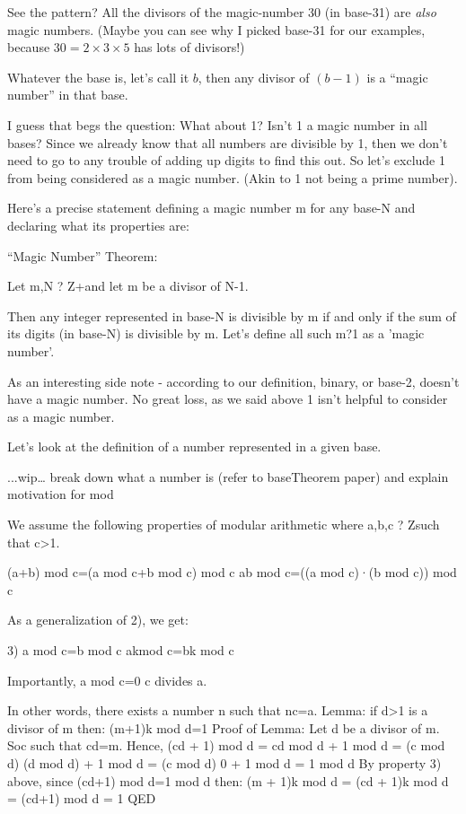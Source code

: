 \documentclass{article}
\begin{document}
See the pattern? All the divisors of the magic-number 30 (in base-31) are \emph{also} magic numbers.
(Maybe you can see why I picked base-31 for our examples, because $30=2\times{}3\times{}5$ has lots of divisors!)

Whatever the base is, let's call it $b$, then any divisor of $(b-1)$ is a ``magic number'' in that base.

I guess that begs the question: What about 1? Isn't 1 a magic number in all bases?
Since we already know that all numbers are divisible by 1,
then we don't need to go to any trouble of adding up digits to find this out.
So let's exclude 1 from being considered as a magic number. (Akin to 1 not being a prime number).

Here's a precise statement defining a magic number
m for any base-N and declaring what its properties are:

``Magic Number'' Theorem:

Let m,N ? Z+and let m be a divisor of N-1.

Then any integer represented in base-N is divisible by m
if and only if the sum of its digits (in base-N)
is divisible by m.
Let's define all such m?1 as a 'magic number'.

As an interesting side note - according to our definition, binary,
or base-2, doesn't have a magic number.
No great loss, as we said above 1 isn't helpful to consider as a magic number. 

Let's look at the definition of a number represented in a given base.

...wip…
break down what a number is (refer to baseTheorem paper) and explain motivation for mod

We assume the following properties of modular arithmetic where a,b,c ? Zsuch that c>1.

(a+b) mod c=(a mod c+b mod c) mod c
ab mod c=((a mod c)·(b mod c)) mod c

As a generalization of 2), we get:

3) a mod c=b mod c akmod c=bk mod c

Importantly, a mod c=0 c divides a.

In other words, there exists a number n such that nc=a.
Lemma:
if d>1 is a divisor of m then:
(m+1)k mod d=1
Proof of Lemma:
Let d be a divisor of m. Soc such that cd=m.
Hence, (cd + 1) mod d = cd mod d + 1 mod d
= (c mod d) (d mod d) + 1 mod d
= (c mod d) 0 + 1 mod d
= 1 mod d
By property 3) above, since (cd+1) mod d=1 mod d then:
(m + 1)k mod d
= (cd + 1)k mod d
= (cd+1) mod d
= 1
QED
\end{document}
